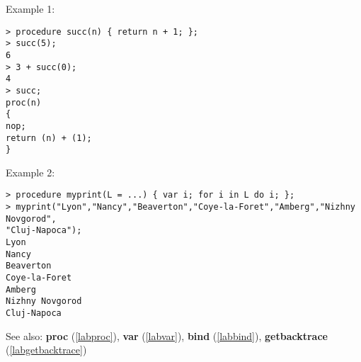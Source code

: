 \noindent Example 1: 
\begin{center}\begin{minipage}{15cm}\begin{Verbatim}[frame=single]
> procedure succ(n) { return n + 1; };
> succ(5);
6
> 3 + succ(0);
4
> succ;
proc(n)
{
nop;
return (n) + (1);
}
\end{Verbatim}
\end{minipage}\end{center}
\noindent Example 2: 
\begin{center}\begin{minipage}{15cm}\begin{Verbatim}[frame=single]
> procedure myprint(L = ...) { var i; for i in L do i; };
> myprint("Lyon","Nancy","Beaverton","Coye-la-Foret","Amberg","Nizhny Novgorod",
"Cluj-Napoca");
Lyon
Nancy
Beaverton
Coye-la-Foret
Amberg
Nizhny Novgorod
Cluj-Napoca
\end{Verbatim}
\end{minipage}\end{center}
See also: \textbf{proc} (\ref{labproc}), \textbf{var} (\ref{labvar}), \textbf{bind} (\ref{labbind}), \textbf{getbacktrace} (\ref{labgetbacktrace})
